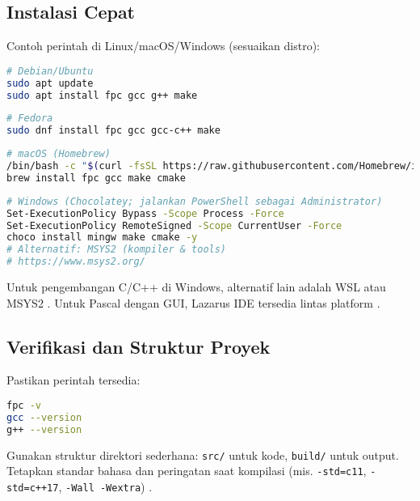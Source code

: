 \documentclass[../main.tex]{subfiles}
\begin{document}
\subsection{Instalasi Cepat}
Contoh perintah di Linux/macOS/Windows (sesuaikan distro):
\begin{lstlisting}[language=bash]
# Debian/Ubuntu
sudo apt update
sudo apt install fpc gcc g++ make
\end{lstlisting}
\begin{lstlisting}[language=bash]
# Fedora
sudo dnf install fpc gcc gcc-c++ make
\end{lstlisting}
\begin{lstlisting}[language=bash]
# macOS (Homebrew)
/bin/bash -c "$(curl -fsSL https://raw.githubusercontent.com/Homebrew/install/HEAD/install.sh)"
brew install fpc gcc make cmake
\end{lstlisting}
\begin{lstlisting}[language=bash]
# Windows (Chocolatey; jalankan PowerShell sebagai Administrator)
Set-ExecutionPolicy Bypass -Scope Process -Force
Set-ExecutionPolicy RemoteSigned -Scope CurrentUser -Force
choco install mingw make cmake -y
# Alternatif: MSYS2 (kompiler & tools)
# https://www.msys2.org/
\end{lstlisting}
Untuk pengembangan C/C++ di Windows, alternatif lain adalah WSL \parencite{wsl} atau MSYS2 \parencite{msys2}. Untuk Pascal dengan GUI, Lazarus IDE tersedia lintas platform \parencite{lazarus}.

\subsection{Verifikasi dan Struktur Proyek}
Pastikan perintah tersedia:
\begin{lstlisting}[language=bash]
fpc -v
gcc --version
g++ --version
\end{lstlisting}
Gunakan struktur direktori sederhana: \texttt{src/} untuk kode, \texttt{build/} untuk output. Tetapkan standar bahasa dan peringatan saat kompilasi (mis. \texttt{-std=c11}, \texttt{-std=c++17}, \texttt{-Wall -Wextra}) \parencite{gnu-c-manual,cpp-reference}.
\end{document}
